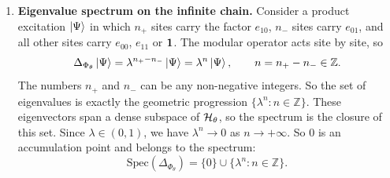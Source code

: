 \begin{keyresult}
\begin{enumerate}[leftmargin=*]
$S_\phi$ is antilinear and the angles are real. So the last two lines say $S_\phi\ket{01}=\cot\theta\ket{10}$
and $S_\phi\ket{10}=\tan\theta\ket{01}$. This is exactly the $4\times4$ Tomita operator found in the worked
example earlier in this chapter. Computing the adjoint $S_\phi^\dagger$ and the modular operator
$\delta_\theta = S_\phi^\dagger S_\phi = \rho_r \otimes \rho_l^{-1}$ on this basis gives four exact
eigenvectors:
\[
\delta_\theta (e_{00}\ket\phi) = 1 \cdot (e_{00}\ket\phi), \qquad
\delta_\theta (e_{11}\ket\phi) = 1 \cdot (e_{11}\ket\phi),
\]
\[
\begin{aligned}
\delta_\theta (e_{10}\ket\phi) &= \tan^2\theta \cdot (e_{10}\ket\phi) = \lambda \cdot (e_{10}\ket\phi), \\
\delta_\theta (e_{01}\ket\phi) &= \cot^2\theta \cdot (e_{01}\ket\phi) = \lambda^{-1} \cdot (e_{01}\ket\phi) .
\end{aligned}
\]
\item \textbf{Eigenvalue spectrum on the infinite chain.}
Consider a product excitation $\ket\Psi$ in which $n_+$ sites carry the factor $e_{10}$, $n_-$ sites carry
$e_{01}$, and all other sites carry $e_{00}$, $e_{11}$ or $\mathbf{1}$. The modular operator acts site by site, so
\[
\Delta_{\Phi_\theta} \ket{\Psi} = \lambda^{n_+ - n_-} \ket{\Psi} = \lambda^n \ket{\Psi},
\qquad n = n_+ - n_- \in \mathbb{Z} .
\]
The numbers $n_+$ and $n_-$ can be any non-negative integers. So the set of eigenvalues is exactly the
geometric progression $\{\lambda^n : n \in \mathbb{Z}\}$. These eigenvectors span a dense subspace of
$\mathcal{H}_\theta$, so the spectrum is the closure of this set. Since $\lambda \in (0, 1)$, we have
$\lambda^n \to 0$ as $n \to +\infty$. So $0$ is an accumulation point and belongs to the spectrum:
\[
\mathrm{Spec}(\Delta_{\Phi_\theta}) = \{0\} \cup \{\lambda^n : n \in \mathbb{Z}\} .
\]


\end{enumerate}
\end{keyresult}
